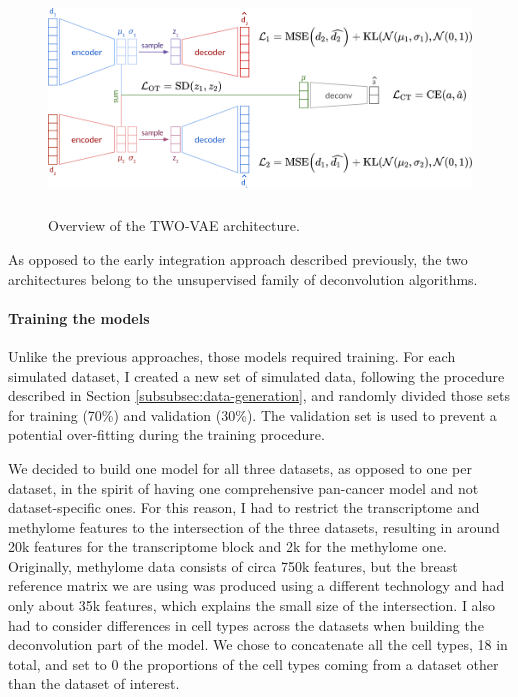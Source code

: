 \documentclass{article}
\begin{document}
\begin{figure}[ht]
    \centering
    \includegraphics[height=6cm,width=\textwidth,keepaspectratio]{fig/TWO-VAE.png}
    \caption{Overview of the TWO-VAE architecture.}
    \label{fig:two_vae}
\end{figure}

As opposed to the early integration approach described previously, the two architectures belong to the unsupervised family of deconvolution algorithms.

\paragraph{Training the models}\label{paragraph:training-the-models}

Unlike the previous approaches, those models required training.
For each simulated dataset, I created a new set of simulated data, following the procedure described in Section \ref{subsubsec:data-generation}, and randomly divided those sets for training (70\%) and validation (30\%).
The validation set is used to prevent a potential over-fitting during the training procedure.

We decided to build one model for all three datasets, as opposed to one per dataset, in the spirit of having one comprehensive pan-cancer model and not dataset-specific ones.
For this reason, I had to restrict the transcriptome and methylome features to the intersection of the three datasets, resulting in around 20k features for the transcriptome block and 2k for the methylome one.
Originally, methylome data consists of circa 750k features, but the breast reference matrix we are using was produced using a different technology and had only about 35k features, which explains the small size of the intersection.
I also had to consider differences in cell types across the datasets when building the deconvolution part of the model.
We chose to concatenate all the cell types, 18 in total, and set to 0 the proportions of the cell types coming from a dataset other than the dataset of interest.
\end{document}

